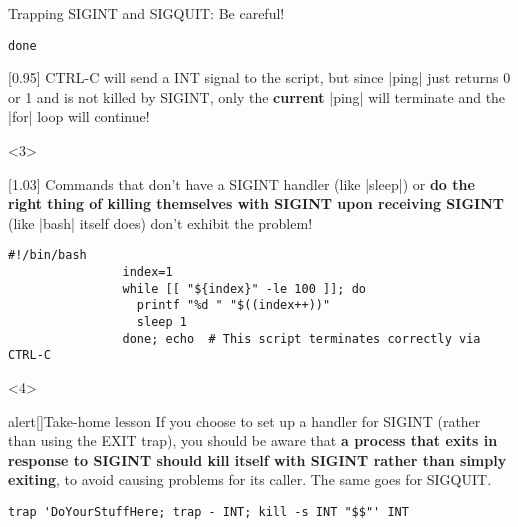 \begin{frame}[fragile]{Trapping SIGINT and SIGQUIT: Be careful!}
\begin{overlayarea}{\textwidth}{0.7\textheight}
\begin{onlyenv}
\begin{lstlisting}[style=MyBash, belowskip=-5mm]
                done
            \end{lstlisting}
            \begin{varblock}{}[0.95\textwidth]{}
                \small CTRL-C will send a INT signal to the script, but since \bash|ping| just returns 0 or 1 and is not killed by SIGINT, only the \alert{\textbf{current}} \bash|ping| will terminate and the \bash|for| loop will continue!
            \end{varblock}
        \end{onlyenv}
        \begin{onlyenv}<3>
            \begin{varblock}{}[1.03\textwidth]{}
                Commands that don't have a SIGINT handler (like \bash|sleep|) or \textbf{do the right thing of killing themselves with SIGINT upon receiving SIGINT} (like \bash|bash| itself does) don't exhibit the problem!
            \end{varblock}
            \begin{lstlisting}[style=MyBash]
                #!/bin/bash
                index=1
                while [[ "${index}" -le 100 ]]; do
                  printf "%d " "$((index++))"
                  sleep 1
                done; echo  # This script terminates correctly via CTRL-C
            \end{lstlisting}
        \end{onlyenv}
        \begin{onlyenv}<4>
            \medskip
            \begin{varblock}{alert}[\textwidth]{Take-home lesson}
                If you choose to set up a handler for SIGINT (rather than using the EXIT trap), you should be aware that \alert{\textbf{a process that exits in response to SIGINT should kill itself with SIGINT rather than simply exiting}}, to avoid causing problems for its caller.
                The same goes for SIGQUIT.
            \end{varblock}
            \begin{lstlisting}[style=MyBash, numbers=none]
                trap 'DoYourStuffHere; trap - INT; kill -s INT "$$"' INT
            \end{lstlisting}
        \end{onlyenv}
    \end{overlayarea}
\end{frame}












